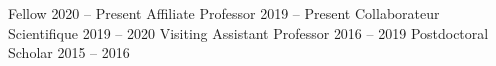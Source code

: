 
        {Fellow}
        {2020 -- Present}
		{Affiliate Professor}
		{2019 -- Present}
		{Collaborateur Scientifique}
		{2019 -- 2020}
		{Visiting Assistant Professor}
		{2016 -- 2019}
		{Postdoctoral Scholar}
		{2015 -- 2016}